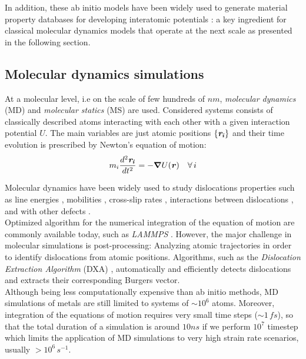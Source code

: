 \documentclass{article}
\begin{document}
In addition, these ab initio models have been widely used to generate material property databases for developing interatomic potentials \parencite{payneinitiodatabases1996}: a key ingredient for classical molecular dynamics models that operate at the next scale as presented in the following section.
\subsection{Molecular dynamics simulations}
At a molecular level, i.e on the scale of few hundreds of $nm$, \emph{molecular dynamics} (MD) and \emph{molecular statics} (MS) are used. Considered systems consists of classically described atoms interacting with each other with a given interaction potential $U$. The main variables are just atomic positions $\{\bm{\mathit{r_i}}\}$ and their time evolution is prescribed by Newton's equation of motion:
\begin{equation}
    m_i \frac{d^2\bm{\mathit{r_i}}}{dt^2} = - \bm{\mathit{\nabla}}U(\bm{\mathit{r}}) \quad \forall \, i
\end{equation}

Molecular dynamics have been widely used to study dislocations properties such as line energies \parencite{zhouAtomisticcalculations2017}, mobilities \parencite{olmstedAtomisticsimulations2004}, cross-slip rates \parencite{raoCalculationsintersection2011}, interactions between dislocations \parencite{zhouLargescalemolecular1998}, and with other defects \parencite{spearotInsightsslip2014}.\\
Optimized algorithm for the numerical integration of the equation of motion are commonly available today, such as \emph{LAMMPS} \parencite{thompsonLAMMPSflexible2022}. However, the major challenge in molecular simulations is post-processing: Analyzing atomic trajectories in order to identify dislocations from atomic positions. Algorithms, such as the \emph{Dislocation Extraction Algorithm} (DXA) \parencite{stukowskiExtractingdislocations2010}, automatically and efficiently detects dislocations and extracts their corresponding Burgers vector.\\


Although being less computationally expensive than ab initio methods, MD simulations of metals are still limited to systems of $\sim 10^6$ atoms. Moreover, integration of the equations of motion requires very small time steps ($\sim 1 \, fs$), so that the total duration of a simulation is around $10 ns$ if we perform $10^7$ timestep which limits the application of MD simulations to very high strain rate scenarios, usually $>10^6 \, s^{-1}$.
\end{document}
